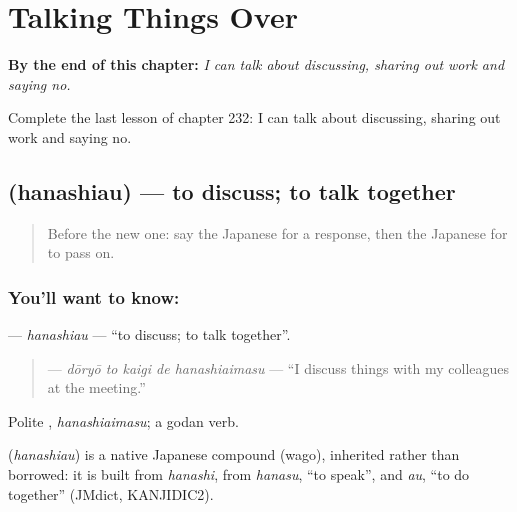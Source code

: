 
\chapter{Talking Things Over}
\label{ch:ja-talking-things-over}

\begin{chapteropening}
\textbf{By the end of this chapter:} \emph{I can talk about discussing, sharing out work and saying no.}

Complete the last lesson of chapter 232: I can talk about discussing, sharing out work and saying no.
\end{chapteropening}

\section[\texorpdfstring{\ja{はなしあう} (hanashiau)}{はなしあう (hanashiau)}]{ (hanashiau) — to discuss; to talk together}

\label{lesson:JA-C232-hanashiau}



\begin{quote}
Before the new one: say the Japanese for a response, then the Japanese for to pass on.
\end{quote}

\subsection*{You'll want to know: }
\textbf{} — \emph{hanashiau} — \textquotedblleft{}to discuss; to talk together\textquotedblright{}.

\begin{quote}
\textbf{  } — \emph{dōryō to kaigi de hanashiaimasu} — \textquotedblleft{}I discuss things with my colleagues at the meeting.\textquotedblright{}
\end{quote}

Polite \textbf{}, \emph{hanashiaimasu}; a godan verb.

\begin{cousinweb}
\textbf{} (\emph{hanashiau}) is a native Japanese compound (wago), inherited rather than borrowed: it is built from \emph{hanashi}, from \emph{hanasu}, \textquotedblleft{}to speak\textquotedblright{}, and \emph{au}, \textquotedblleft{}to do together\textquotedblright{} (JMdict, KANJIDIC2).
\end{cousinweb}

